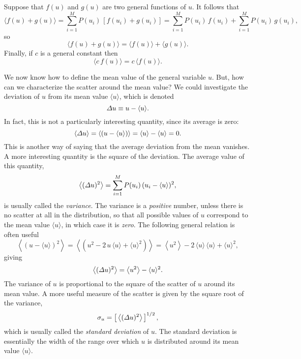 Suppose that $f(u)$ and $g(u)$ are two general functions of $u$. It follows that
\begin{equation}
\langle f(u)+g(u)\rangle = \sum_{i=1}^{M}P(u_i)\,[f(u_i)+g(u_i)]
= \sum_{i=1}^{M}P(u_i)\,f(u_i)+ \sum_{i=1}^{M}P(u_i)\,g(u_i),
\end{equation}
so
\begin{equation}
\langle f(u)+g(u)\rangle= \langle f(u)\rangle+\langle g(u)\rangle.
\end{equation}
Finally, if $c$ is a general constant then 
\begin{equation}
\langle c \,f(u)\rangle = c\,\langle f(u)\rangle.
\end{equation}

We now know how to define the mean value of the general variable $u$. 
But, how can we  characterize the scatter around the mean value?
We could investigate the deviation of $u$ from its mean value $\langle u\rangle$,
which is denoted
\begin{equation}
{\mit\Delta} u \equiv  u- \langle u\rangle.
\end{equation}
In fact, this is not a particularly interesting quantity, since its average
is  zero:
\begin{equation}
\langle {\mit\Delta} u\rangle = \left\langle(u-\langle u\rangle)\right\rangle = \langle u\rangle-\langle u\rangle = 0.
\end{equation}
This is another way of saying that the average deviation from the
mean vanishes. A more interesting quantity is the square of the 
deviation. The average value of this quantity,
\begin{equation}\label{dvar}
\left\langle ({\mit\Delta} u)^2\right\rangle = \sum_{i=1}^M P(u_i)\,(u_i - \langle u\rangle)^2,
\end{equation}
is usually called the
{\em variance}.
The variance is  a  {\em positive} number,
 unless there is no scatter at all in the
distribution, so that all possible values of $u$ correspond to the
mean value $\langle u\rangle$, in which case it is {\em zero}. 
The following general relation
is often useful
\begin{equation}
\left \langle (u-\langle u\rangle )^2\right\rangle = \left\langle(
u^2-2\,u\,\langle u\rangle+\langle u\rangle^2)\right\rangle= \left\langle u^2\right\rangle-2\,\langle u\rangle\,\langle u\rangle+\langle u\rangle^2,
\end{equation}
giving
\begin{equation}
\left\langle({\mit\Delta} u)^2\right\rangle= \left\langle u^2\right\rangle-\langle u\rangle^2.
\end{equation}
The variance of $u$ 
is proportional to the square of the scatter
of $u$ around its mean value. A more useful  measure of the scatter
 is given by the square root of the variance,
\begin{equation}
\sigma_u = \left[\,\left\langle({\mit\Delta} u)^2\right\rangle\,\right]^{1/2},
\end{equation}
which is usually called the {\em standard deviation} of $u$. The
standard deviation is essentially the width of the range over which
$u$ is distributed around its mean value $\langle u\rangle$.

